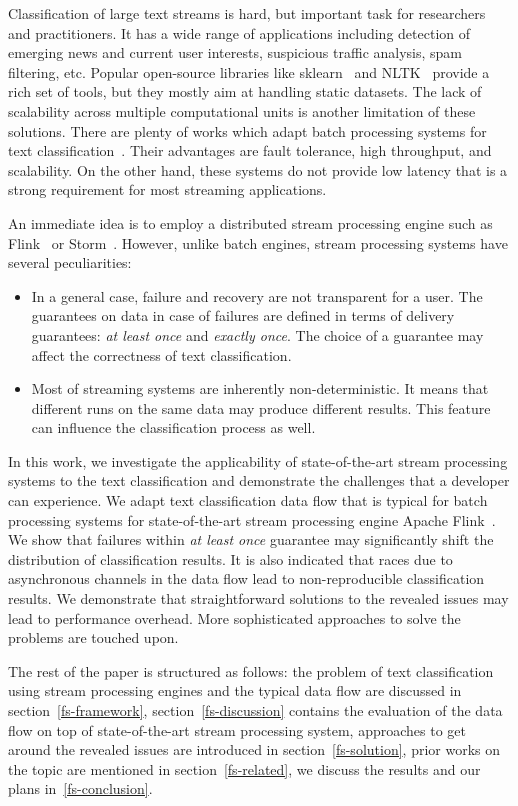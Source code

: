 \label {fs-short-intro}

Classification of large text streams is hard, but important task for researchers and practitioners. It has a wide range of applications including detection of emerging news and current user interests, suspicious traffic analysis, spam filtering, etc. Popular open-source libraries like sklearn~\cite{sklearn_api} and NLTK~\cite{bird2009natural} provide a rich set of tools, but they mostly aim at handling static datasets. The lack of scalability across multiple computational units is another limitation of these solutions. There are plenty of works which adapt batch processing systems for text classification~\cite{semberecki2016distributed, svyatkovskiy2016large, baltas2016apache}. Their advantages are fault tolerance, high throughput, and scalability. On the other hand, these systems do not provide low latency that is a strong requirement for most streaming applications.

An immediate idea is to employ a distributed stream processing engine such as Flink~\cite{Carbone:2017:SMA:3137765.3137777} or Storm~\cite{apache:storm}. However, unlike batch engines, stream processing systems have several peculiarities: 

\begin{itemize}
    \item In a general case, failure and recovery are not transparent for a user. The guarantees on data in case of failures are defined in terms of delivery guarantees: {\em at least once} and {\em exactly once}. The choice of a guarantee may affect the correctness of text classification.
    \item Most of streaming systems are inherently non-deterministic. It means that different runs on the same data may produce different results. This feature can influence the classification process as well.
\end{itemize}

In this work, we investigate the applicability of state-of-the-art stream processing systems to the text classification and demonstrate the challenges that a developer can experience. We adapt text classification data flow that is typical for batch processing systems for state-of-the-art stream processing engine Apache Flink~\cite{Carbone:2017:SMA:3137765.3137777}. We show that failures within {\em at least once} guarantee may significantly shift the distribution of classification results. It is also indicated that races due to asynchronous channels in the data flow lead to non-reproducible classification results. We demonstrate that straightforward solutions to the revealed issues may lead to performance overhead. More sophisticated approaches to solve the problems are touched upon.

The rest of the paper is structured as follows: the problem of text classification using stream processing engines and the typical data flow are discussed in section~\ref{fs-framework}, section~\ref{fs-discussion} contains the evaluation of the data flow on top of state-of-the-art stream processing system, approaches to get around the revealed issues are introduced in section~\ref{fs-solution}, prior works on the topic are mentioned in section~\ref{fs-related}, we discuss the results and our plans in~\ref{fs-conclusion}.